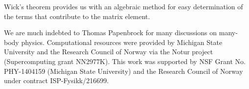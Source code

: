 Wick's theorem provides us with an algebraic method for easy determination of the terms that contribute to the matrix element.




\begin{acknowledgement}
We are much indebted to Thomas Papenbrock for many discussions on many-body physics.
Computational resources were provided by Michigan State University and the Research Council of Norway via the Notur project (Supercomputing grant NN2977K).
This work was supported by NSF Grant No. PHY-1404159 (Michigan State University)  and  the Research Council of Norway under contract ISP-Fysikk/216699.
\end{acknowledgement}










 





